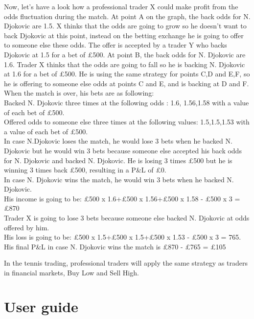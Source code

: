 \documentclass[10pt]{report}
\begin{document}
Now, let's have a look how a professional trader X could make profit from the odds fluctuation during the match.
At point A on the graph, the back odds for N. Djokovic are 1.5. X thinks that the odds are going to grow so he doesn't want to back Djokovic at this point,
instead on the betting exchange he is going to offer to someone else these odds. The offer is accepted by a trader Y who backs Djokovic at 1.5 for a bet of \pounds500. 
At point B, the back odds for N. Djokovic are 1.6. Trader X thinks that the odds are going to fall so he is backing N. Djokovic at 1.6 for a bet of \pounds500. 
He is using the same strategy for points C,D and E,F, so he is offering to someone else odds at points C and E, and is backing at D and F. \\
When the match is over, his bets are as following:\\
Backed N. Djokovic three times at the following odds : 1.6, 1.56,1.58 with a value of each bet of \pounds500. \\
Offered odds to someone else three times at the following values: 1.5,1.5,1.53 with a value of each bet of \pounds500.\\

In case N.Djokovic loses the match, he would lose 3 bets when he backed N. Djokovic but he would win 3 bets because someone else accepted his back odds for N. Djokovic 
and backed N. Djokovic. 
He is losing 3 times \pounds500 but he is winning 3 times back \pounds500, resulting in a P\&L of \pounds0.\\

In case N. Djokovic wins the match, he would win 3 bets when he backed N. Djokovic. \\
His income is going to be: \pounds500 x 1.6+\pounds500 x 1.56+\pounds500 x 1.58 -  \pounds500 x 3 = \pounds870\\
Trader X is going to lose 3 bets because someone else backed N. Djokovic at odds offered by him. \\
His loss is going to be: \pounds500 x 1.5+\pounds500 x 1.5+\pounds500 x 1.53 - \pounds500 x 3  = 765. \\
His final  P\&L in case N. Djokovic wins the match is \pounds870 - \pounds765 = \pounds105

In the tennis trading, professional traders will apply the same strategy as traders in financial markets, Buy Low and Sell High. 

\chapter{User guide}
\end{document}
